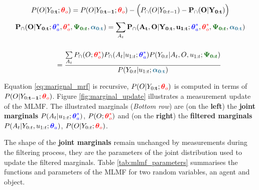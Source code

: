 \documentclass{frontiersSCNS} %
\newcommand*{\mathcolor}{}
\def\mathcolor#1#{\mathcoloraux{#1}}
\newcommand*{\mathcoloraux}[3]{%
  \protect\leavevmode
  \begingroup
    \color#1{#2}#3%
  \endgroup
}
\newcommand{\ThAs}{\boldsymbol{\theta}^*_a}
\newcommand{\ThOs}{\boldsymbol{\theta}^*_o}
\newcommand{\ThA}{\boldsymbol{\theta}_a}
\newcommand{\ThO}{\boldsymbol{\theta}_o}
\newcommand{\BAlph}{\boldsymbol{\alpha}_{\mathbf{0:t}}}
\newcommand{\BPsi}{\boldsymbol{\Psi_{0:t}}}
\begin{document}
\begin{equation}
 P(O|Y_{0:\mathbf{t}};\mathcolor{red}{\ThO}) = P(O|Y_{0:\mathbf{t-1}};\mathcolor{red}{\ThO}) - \Big(P_{\cap}(O|Y_{0:t-1}) -  \mathbf{P_{\cap}(O|Y_{0:t})}  \Big)   \label{eq:marignal_mrf}  
\end{equation}
\begin{align}
 &\mathbf{P_{\cap}(O|Y_{0:t}};\mathcolor{blue}{\ThAs},\mathcolor{red}{\ThOs},\mathcolor{dark-green}{\BPsi},\mathcolor{dark-blue}{\BAlph})  = \sum\limits_{A_t} \mathbf{P_{\cap}(A_t,O|Y_{0:t},u_{1:t}};\mathcolor{blue}{\ThAs},\mathcolor{red}{\ThOs},\mathcolor{dark-green}{\BPsi},\mathcolor{dark-blue}{\BAlph}) \nonumber \\[0.5cm]
 &\hspace*{2cm} =\frac{ \sum\limits_{A_t} P_{\cap}(O;\mathcolor{red}{\ThOs}) P_{\cap}(A_t|u_{1:t};\mathcolor{blue}{\ThAs})  P(Y_{0:t}|A_t,O,u_{1:t};\mathcolor{dark-green}{\BPsi})}{P(Y_{0:t}|u_{1:t};\mathcolor{dark-blue}{\BAlph})} \label{eq:marignal_mrf_2} 
\end{align}



Equation \ref{eq:marignal_mrf} is recursive, $P(O|Y_{0:\mathbf{t}};\mathcolor{red}{\ThO})$ is computed in terms of $P(O|Y_{0:\mathbf{t-1}};\mathcolor{red}{\ThO})$. 
Figure \ref{fig:marginal_update} illustrates a measurement update of the MLMF.  The illustrated marginals (\textit{Bottom row}) are 
(on the \textbf{left}) the \textbf{joint marginals} $P(A_t|u_{1:t};\mathcolor{blue}{\ThAs})$, $P(O;\mathcolor{red}{\ThOs})$ and (on the \textbf{right}) the \textbf{filtered marginals} $P(A_t|Y_{0:t},u_{1:t};\mathcolor{blue}{\ThA})$, $P(O|Y_{0:t};\mathcolor{red}{\ThO})$. 


The shape of the \textbf{joint marginals} remain unchanged by measurements during the filtering process, they are the parameters of the joint distribution used to update the filtered marginals. 
Table \ref{tab:mlmf_parameters} summarises the functions and parameters of the MLMF for two random variables, an agent and object.
\end{document}
